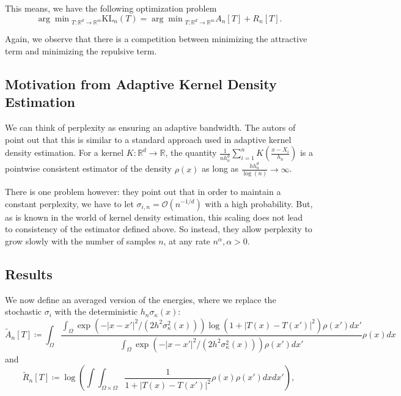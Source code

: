 This means, we have the following optimization problem
\begin{equation}
    {\arg \min}_{T: \mathbb{R}^d \to \mathbb{R}^m} \text{KL}_n (T) = {\arg \min}_{T: \mathbb{R}^d \to \mathbb{R}^m} A_n[T] + R_n[T].
\end{equation}

Again, we observe that there is a competition between minimizing the attractive term and minimizing the repulsive term. 

\subsection{Motivation from Adaptive Kernel Density Estimation}

We can think of perplexity as ensuring an adaptive bandwidth. 
The autors of \cite{murray2024largedatalimitsscaling} point out that this is similar to a standard approach used in adaptive kernel density estimation. 
For a kernel $K: \mathbb{R}^d \to \mathbb{R}$, the quantity $\frac{1}{n h_n^d}\sum_{i=1}^n K(\frac{x-X_i}{h_n})$ is a pointwise consistent estimator of the density $\rho(x)$ as long as $\frac{h h_n^d}{\log(n)} \to \infty$. 

There is one problem however: they point out that in order to maintain a constant perplexity, we have to let $\sigma_{i,n} = \mathcal{O}(n^{-1/d})$ with a high probability. 
But, as is known in the world of kernel density estimation, this scaling does not lead to consistency of the estimator defined above. 
So instead, they allow perplexity to grow slowly with the number of samples $n$, at any rate $n^\alpha, \alpha > 0$. 

\subsection{Results}

We now define an averaged version of the energies, where we replace the stochastic $\sigma_i$ with the deterministic $h_n \sigma_\kappa(x)$: 
\begin{equation}
    \tilde{A}_n[T] \coloneq  \int_{\Omega} \frac{\int_{\Omega} \exp(-|x - x'|^2/(2 h^2 \sigma_\kappa^2(x))) \log(1+ |T(x) - T(x')|^2) \rho(x')dx'}{\int_{\Omega} \exp(-|x - x'|^2/(2 h^2 \sigma_\kappa^2(x))) \rho(x')dx'} \rho(x)dx  
\end{equation}
and 
\begin{equation}
    \tilde{R}_n[T] \coloneq \log \left( \int \int_{\Omega \times \Omega} \frac{1}{1+ |T(x) - T(x')|^2} \rho(x) \rho(x')dx dx' \right), 
\end{equation}

